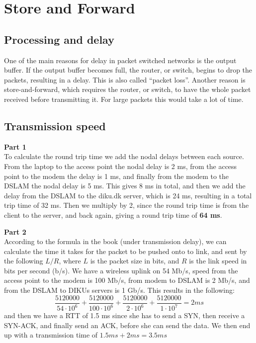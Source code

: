 \section{Store and Forward}
\subsection{Processing and delay}
One of the main reasons for delay in packet switched networks is the output
buffer. If the output buffer becomes full, the router, or switch, begins to drop
the packets, resulting in a delay. This is also called ``packet loss''. Another
reason is store-and-forward, which requires the router, or switch, to have the
whole packet received before transmitting it. For large packets this would take
a lot of time.

\subsection{Transmission speed}
\textbf{Part 1}\\
To calculate the round trip time we add the nodal delays between each source.
From the laptop to the access point the nodal delay is 2 ms, from the access
point to the modem the delay is 1 ms, and finally from the modem to the DSLAM
the nodal delay is 5 ms. This gives 8 ms in total, and then we add the delay from the
DSLAM to the diku.dk server, which is 24 ms, resulting in a total trip time of
32 ms. Then we multiply by 2, since the round trip time is from the client to
the server, and back again, giving a round trip time of \textbf{64 ms}.

\noindent \textbf{Part 2}\\
According to the formula in the book (under transmission delay), we can
calculate the time it takes for the packet to be pushed onto to link, and sent
by the following $L/R$, where $L$ is the packet size in bits, and $R$ is the
link speed in bits per second (b/s). We have a wireless uplink on 54 Mb/s, speed
from the access point to the modem is 100 Mb/s, from modem to DSLAM is 2 Mb/s,
and from the DSLAM to DIKUs servers is 1 Gb/s.
This results in the following:
\[
\frac{5120000}{54 \cdot 10^6} + \frac{5120000}{100 \cdot 10^6} +
\frac{5120000}{2 \cdot 10^6} + \frac{5120000}{1 \cdot 10^7} = 2ms
\]
and then we have a RTT of 1.5 ms since she has to send a SYN, then receive a
SYN-ACK, and finally send an ACK, before she can send the data. We then end up
with a transmission time of $1.5ms + 2ms = 3.5 ms$
